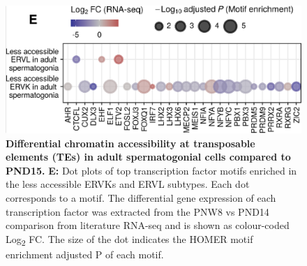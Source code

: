 \documentclass[12pt,twoside]{reedthesis}
\begin{document}
\begin{subfigures}
\begin{figure}[htbp]

{\centering \includegraphics{thesis_files/figure-latex/df5b-1} 

}

\caption[Differential chromatin accessibility at transposable elements (TEs) in adult spermatogonial cells compared to PND15]{ \textbf{Differential chromatin accessibility at transposable elements (TEs) in adult spermatogonial cells compared to PND15.} \newline \textbf{E:} Dot plots of top transcription factor motifs enriched in the less accessible ERVKs and ERVL subtypes. Each dot corresponds to a motif. The differential gene expression of each transcription factor was extracted from the PNW8 vs PND14 comparison from literature RNA-seq and is shown as colour-coded Log\textsubscript{2} FC. The size of the dot indicates the HOMER motif enrichment adjusted P of each motif.}\label{fig:df5b}
\end{figure}
\end{subfigures}
\end{document}
